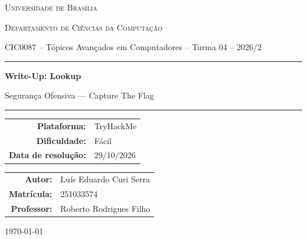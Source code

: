 \documentclass[12pt,a4paper]{article}
\newcommand{\desafioNome}{Lookup}
\newcommand{\plataforma}{TryHackMe}
\newcommand{\dificuldade}{Fácil}
\newcommand{\dataResolucao}{29/10/2026}
\newcommand{\autorNome}{Luís Eduardo Curi Serra}
\newcommand{\materia}{CIC0087 -- Tópicos Avançados em Computadores -- Turma 04 -- 2026/2}
\newcommand{\departamento}{Departamento de Ciências da Computação}
\newcommand{\matricula}{251033574}
\newcommand{\professor}{Roberto Rodrigues Filho}
\newcommand{\universidade}{Universidade de Brasília}
\begin{document}
\begin{titlepage}
  \thispagestyle{empty}
  \centering
  {\scshape \universidade \par}
  {\scshape \departamento \par}
  \vspace{0.4cm}
  {\small \materia \par}
  \vspace{2.5cm}

  \rule{\linewidth}{0.4pt}\par
  \vspace{0.6cm}
  {\huge \bfseries Write-Up: \desafioNome \par}
  \vspace{0.4cm}
  {\large Segurança Ofensiva --- Capture The Flag \par}
  \vspace{0.6cm}
  \rule{\linewidth}{0.4pt}\par

  \vspace{2.0cm}
  \begin{tabular}{rl}
    \textbf{Plataforma:}       & \plataforma       \\[4pt]
    \textbf{Dificuldade:}      & \dificuldade      \\[4pt]
    \textbf{Data de resolução:}& \dataResolucao    \\
  \end{tabular}

  \vfill

  \begin{tabular}{rl}
    \textbf{Autor:}     & \autorNome  \\[4pt]
    \textbf{Matrícula:} & \matricula  \\[4pt]
    \textbf{Professor:} & \professor  \\
  \end{tabular}

  \vspace{1.2cm}
  {\small \today \par}
\end{titlepage}

\newpage
\tableofcontents
\thispagestyle{fancy}
\newpage

\end{document}
